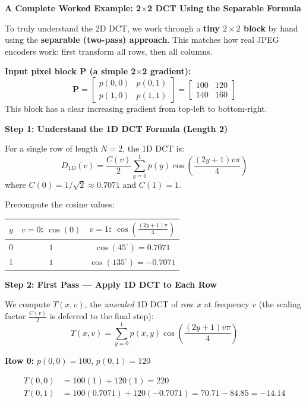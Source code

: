 \begin{examplebox}
\textbf{A Complete Worked Example: 2$\times$2 DCT Using the Separable Formula}

To truly understand the 2D DCT, we work through a \textbf{tiny $2\times2$ block}
by hand using the \textbf{separable (two-pass) approach}. This matches how real
JPEG encoders work: first transform all rows, then all columns.

\medskip
\noindent
\textbf{Input pixel block $\mathbf{P}$ (a simple 2$\times$2 gradient):}
\[
\mathbf{P} = \begin{bmatrix}
p(0,0) & p(0,1) \\
p(1,0) & p(1,1)
\end{bmatrix}
= \begin{bmatrix}
100 & 120 \\
140 & 160
\end{bmatrix}
\]
This block has a clear increasing gradient from top‑left to bottom‑right.

\medskip
\noindent
\textbf{\large Step 1: Understand the 1D DCT Formula (Length 2)}

For a single row of length $N=2$, the 1D DCT is:
\[
D_{1D}(v) = \frac{C(v)}{2} \sum_{y=0}^{1} p(y) \cos\!\left(\frac{(2y+1)v\pi}{4}\right)
\]
where $C(0)=1/\sqrt{2} \approx 0.7071$ and $C(1)=1$.

Precompute the cosine values:
\begin{center}
\begin{tabular}{c|c|c}
$y$ & $v=0$: $\cos(0)$ & $v=1$: $\cos\!\left(\frac{(2y+1)\pi}{4}\right)$ \\ \hline
0 & $1$ & $\cos(45^\circ)=0.7071$ \\
1 & $1$ & $\cos(135^\circ)=-0.7071$ \\
\end{tabular}
\end{center}

\medskip
\noindent
\textbf{\large Step 2: First Pass --- Apply 1D DCT to Each Row}

We compute $T(x,v)$, the \emph{unscaled} 1D DCT of row $x$ at frequency $v$
(the scaling factor $\frac{C(v)}{2}$ is deferred to the final step):
\[
T(x,v) = \sum_{y=0}^{1} p(x,y) \cos\!\left(\frac{(2y+1)v\pi}{4}\right)
\]

\noindent
\textbf{Row 0:} $p(0,0)=100$, $p(0,1)=120$

\begin{align*}
T(0,0) &= 100(1) + 120(1) = 220 \\
T(0,1) &= 100(0.7071) + 120(-0.7071) = 70.71 - 84.85 = -14.14
\end{align*}


\end{examplebox}
